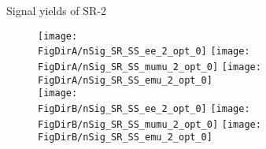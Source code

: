 \begin{frame}{Signal yields of SR-2}
  \begin{figure}
    \centering
    \texttt{[image: \\FigDirA/nSig\_SR\_SS\_ee\_2\_opt\_0]}
    \texttt{[image: \\FigDirA/nSig\_SR\_SS\_mumu\_2\_opt\_0]}
    \texttt{[image: \\FigDirA/nSig\_SR\_SS\_emu\_2\_opt\_0]}\\
    \texttt{[image: \\FigDirB/nSig\_SR\_SS\_ee\_2\_opt\_0]}
    \texttt{[image: \\FigDirB/nSig\_SR\_SS\_mumu\_2\_opt\_0]}
    \texttt{[image: \\FigDirB/nSig\_SR\_SS\_emu\_2\_opt\_0]}
  \end{figure}
\end{frame}
